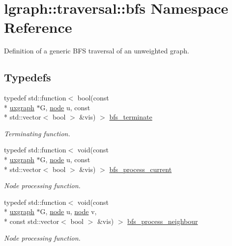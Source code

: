 \hypertarget{namespacelgraph_1_1traversal_1_1bfs}{\section{lgraph\-:\-:traversal\-:\-:bfs Namespace Reference}
\label{namespacelgraph_1_1traversal_1_1bfs}
}


Definition of a generic B\-F\-S traversal of an unweighted graph.  


\subsection*{Typedefs}
\begin{DoxyCompactItemize}
\item 
typedef std\-::function$<$ bool(const \\*
\hyperlink{classlgraph_1_1uxgraph}{uxgraph} $\ast$G, \hyperlink{namespacelgraph_a397169dd66adf725210a30fb7251773e}{node} u, const \\*
std\-::vector$<$ bool $>$ \&vis) $>$ \hyperlink{namespacelgraph_1_1traversal_1_1bfs_a69a129d105f75c4e0093cbd1ae7f53b5}{bfs\-\_\-terminate}
\begin{DoxyCompactList}\small\item\em Terminating function. \end{DoxyCompactList}\item 
typedef std\-::function$<$ void(const \\*
\hyperlink{classlgraph_1_1uxgraph}{uxgraph} $\ast$G, \hyperlink{namespacelgraph_a397169dd66adf725210a30fb7251773e}{node} u, const \\*
std\-::vector$<$ bool $>$ \&vis) $>$ \hyperlink{namespacelgraph_1_1traversal_1_1bfs_af0722b6cc643380c87128c791fb74599}{bfs\-\_\-process\-\_\-current}
\begin{DoxyCompactList}\small\item\em Node processing function. \end{DoxyCompactList}\item 
typedef std\-::function$<$ void(const \\*
\hyperlink{classlgraph_1_1uxgraph}{uxgraph} $\ast$G, \hyperlink{namespacelgraph_a397169dd66adf725210a30fb7251773e}{node} u, \hyperlink{namespacelgraph_a397169dd66adf725210a30fb7251773e}{node} v, \\*
const std\-::vector$<$ bool $>$ \&vis) $>$ \hyperlink{namespacelgraph_1_1traversal_1_1bfs_a4db72f35e69ecdb59756c0258fabb821}{bfs\-\_\-process\-\_\-neighbour}
\begin{DoxyCompactList}\small\item\em Node processing function. \end{DoxyCompactList}\end{DoxyCompactItemize}
